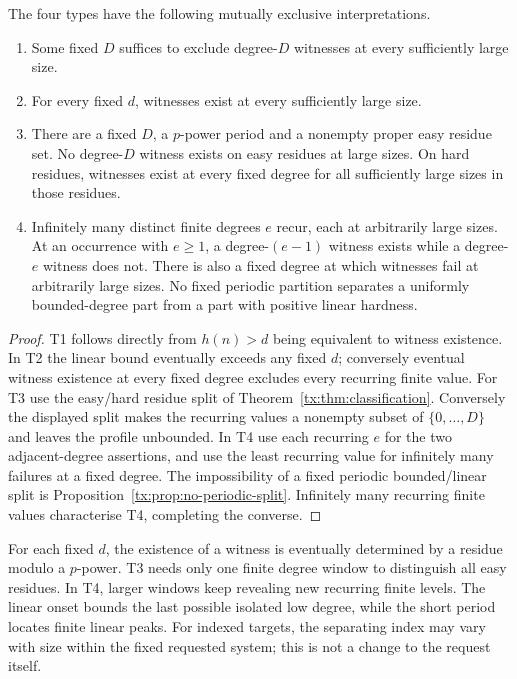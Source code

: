 \begin{proposition}
\label{tx:prop:semantic-types}
The four types have the following mutually exclusive interpretations.
\begin{enumerate}[label=\textup{T\arabic*.}]
\item Some fixed $D$ suffices to exclude degree-$D$ witnesses at every
      sufficiently large size.
\item For every fixed $d$, witnesses exist at every sufficiently large
      size.
\item There are a fixed $D$, a $p$-power period and a nonempty proper
      easy residue set. No degree-$D$ witness exists on easy residues
      at large sizes. On hard residues, witnesses exist at every fixed
      degree for all sufficiently large sizes in those residues.
\item Infinitely many distinct finite degrees $e$ recur, each at
      arbitrarily large sizes. At an occurrence with $e\ge1$, a degree-$(e-1)$ witness
      exists while a degree-$e$ witness does not. There is also a fixed
      degree at which witnesses fail at arbitrarily large sizes. No
      fixed periodic partition separates a uniformly bounded-degree
      part from a part with positive linear hardness.
\end{enumerate}
\end{proposition}
\begin{proof}
T1 follows directly from $h(n)>d$ being equivalent to witness
existence. In T2 the linear bound eventually exceeds any fixed $d$;
conversely eventual witness existence at every fixed degree excludes
every recurring finite value. For T3 use the easy/hard residue split
of Theorem~\ref{tx:thm:classification}. Conversely the displayed split
makes the recurring values a nonempty subset of $\{0,\ldots,D\}$
and leaves the profile unbounded. In T4 use each recurring $e$ for
the two adjacent-degree assertions, and use the least recurring value
for infinitely many failures at a fixed degree. The impossibility of
a fixed periodic bounded/linear split is
Proposition~\ref{tx:prop:no-periodic-split}. Infinitely many recurring
finite values characterise T4, completing the converse.
\end{proof}

For each fixed $d$, the existence of a witness is eventually determined
by a residue modulo a $p$-power. T3 needs only one finite degree window
to distinguish all easy residues. In T4, larger windows keep revealing
new recurring finite levels. The linear onset bounds the last possible
isolated low degree, while the short period locates finite linear peaks.
For indexed targets, the separating index may vary with size within
the fixed requested system; this is not a change to the request itself.

